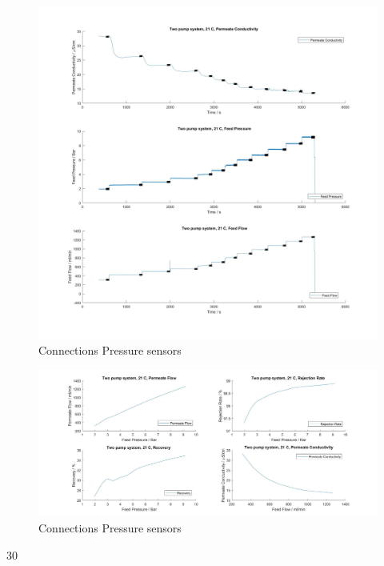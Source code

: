 \begin{figure}[H]
    \centering
    \includegraphics[width=1.1\textwidth]{FeedPumpIncrease21}
    \caption{Connections Pressure sensors}
    \label{fig:PressConn}
\end{figure}


\begin{figure}[H]
    \centering
    \includegraphics[width=1.1\textwidth]{FeedPumpIncrease21Key}
    \caption{Connections Pressure sensors}
    \label{fig:PressConn}
\end{figure}

30


